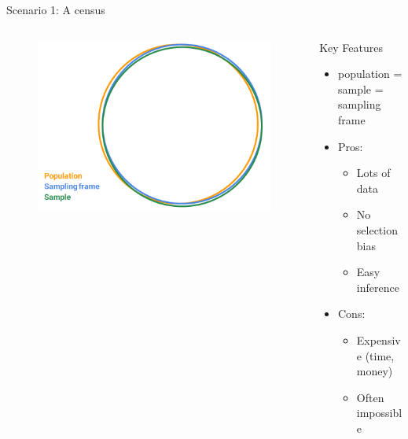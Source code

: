\documentclass[aspectratio=169]{../latex_main/tntbeamer}  %
\begin{document}
	
	\begin{frame}{Scenario 1: A census}
	    \begin{columns}
	        \begin{column}{.4\textwidth}
	           \begin{figure}
	               \includegraphics[scale=.3]{Bild3}
	           \end{figure}
	        \end{column}
	        
	        \begin{column}{.4\textwidth}
	            Key Features
                \begin{itemize}
                    \item population = sample = sampling frame
                    \item Pros:
                    \begin{itemize}
                        \item Lots of data
                        \item No selection bias
                        \item Easy inference
                    \end{itemize}
                    \item Cons:
                    \begin{itemize}
                        \item Expensive (time, money)
                        \item Often impossible

                    \end{itemize}
                \end{itemize}
	        \end{column}
	        
	    \end{columns}
	    
	\end{frame}
	
\end{document}
